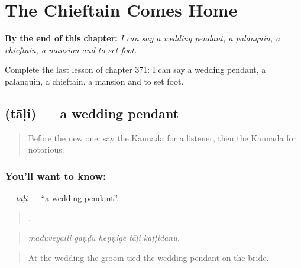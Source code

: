
\chapter{The Chieftain Comes Home}
\label{ch:ka-the-chieftain-comes-home}

\begin{chapteropening}
\textbf{By the end of this chapter:} \emph{I can say a wedding pendant, a palanquin, a chieftain, a mansion and to set foot.}

Complete the last lesson of chapter 371: I can say a wedding pendant, a palanquin, a chieftain, a mansion and to set foot.
\end{chapteropening}

\section[\texorpdfstring{\kn{ತಾಳಿ} (tāḷi)}{ತಾಳಿ (tāḷi)}]{ (tāḷi) — a wedding pendant}

\label{lesson:KA-C371-tali}



\begin{quote}
Before the new one: say the Kannada for a listener, then the Kannada for notorious.
\end{quote}

\subsection*{You'll want to know: }
\textbf{} — \emph{tāḷi} — \textquotedblleft{}a wedding pendant\textquotedblright{}.

\begin{quote}
    .
\end{quote}

\begin{quote}
\emph{maduveyalli gaṇḍu heṇṇige tāḷi kaṭṭidanu.}
\end{quote}

\begin{quote}
At the wedding the groom tied the wedding pendant on the bride.
\end{quote}

